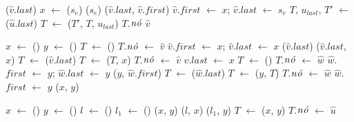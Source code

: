 \begin{algorithm}[htb]
\caption{\LCOCycle($\hat v$, $s_e$)}
\label{Algo:LCOCycle}
\begin{algorithmic}[1]
\State \linkcutEvert($\hat v$.$last$)
\State\Return
\EndIf
\State $x$ $\gets$ \linkcutParent($s_e$)
\State \linkcutDelEdge($s_e$)
\State \linkcutAddEdge($\hat v$.$last$, $\hat v$.$first$)
\State $\hat v$.$first$ $\gets$ $x$; $\hat v$.$last$ $\gets$ $s_e$
\State $T$, $u_{last}$, $T'$ $\gets$ \treapSplit($\hat u$.$last$)
\State $T$ $\gets$ \treapJoin($T'$, $T$, $u_{last}$)
\State $T$.$\mathit{n\acute{o}}$ $\hat v$
\end{algorithmic}
\end{algorithm}


\begin{algorithm}[htb]
\caption{\LCOLink($\hat v$, $\hat w$)}
\label{Algo:LCOLink}
\begin{algorithmic}[1]
\State $x$ $\gets$ \linkcutCreate()
\State $y$ $\gets$ \linkcutCreate()
  \State $T$ $\gets$ \treapCreate()
  \State $T$.$\mathit{n\acute{o}}$ $\gets$ $\hat v$
  \State $\hat v$.$first$ $\gets$ $x$; $\hat v$.$last$ $\gets$ $x$ 
\Else
  \State \linkcutEvert($\hat v$.$last$)
  \State \linkcutAddEdge($\hat v$.$last$, $x$)
  \State $T$ $\gets$ \treapGetRoot($\hat v$.$last$)
  \State $T$ $\gets$ \treapJoin($T$, $x$)
  \State $T$.$\mathit{n\acute{o}}$ $\gets$ $\hat v$
  \State $\hat v$.$last$ $\gets$ $x$
\EndIf
{}
  \State $T$ $\gets$ \treapCreate()
  \State $T$.$\mathit{n\acute{o}}$ $\gets$ $\hat w$
  \State $\hat w$.$first$ $\gets$ $y$; $\hat w$.$last$ $\gets$ $y$ 
\Else
  \State \linkcutAddEdge($y$, $\hat w$.$first$)
  \State $T$ $\gets$ \treapGetRoot($\hat w$.$last$)
  \State $T$ $\gets$ \treapJoin($y$, $T$)
  \State $T$.$\mathit{n\acute{o}}$ $\gets$ $\hat w$
  \State $\hat w$.$first$ $\gets$ $y$
\EndIf
\State \linkcutAddEdge($x$, $y$)
\end{algorithmic}
\end{algorithm}


\begin{algorithm}[htb]
\caption{\LCOLoop($\hat u$)}
\label{Algo:LCOLoop}
\begin{algorithmic}[1]
\State $x$ $\gets$ \linkcutCreate()
\State $y$ $\gets$ \linkcutCreate()
\State $l$ $\gets$ \linkcutCreate()
\State $l_1$ $\gets$ \linkcutCreate()
\State \linkcutAddEdge($x$, $y$)
\State \linkcutAddEdge($l$, $x$)
\State \linkcutAddEdge($l_1$, $y$)
\State $T$ $\gets$ \treapJoin($x$, $y$)
\State $T$.$\mathit{n\acute{o}}$ $\gets$ $\hat u$
\end{algorithmic}
\end{algorithm}






